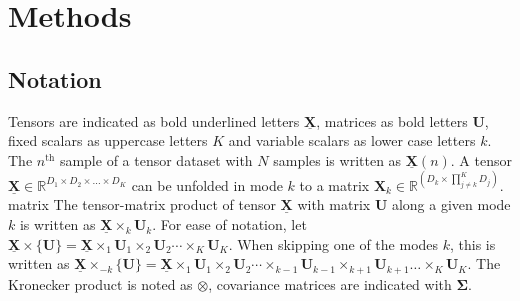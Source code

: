 \documentclass[twocolumn]{article}
\newcommand{\ten}[1]{\underline{\mathbf{#1}}} %
\newcommand{\mat}[1]{\mathbf{#1}} %
\newcommand{\mpr}[2]{\times_{#2} {#1}_{#2}} %
\newcommand{\mmpr}[1]{\times\{#1\}} %
\newcommand{\mmprs}[2]{\times_{-#2}\{#1\}} %
\begin{document}
\section{Methods}

\subsection{Notation}
Tensors are indicated as bold underlined letters $\ten{X}$, matrices as bold
letters $\mat{U}$, fixed scalars as uppercase letters $K$ and variable
scalars as lower case letters $k$.
The $n^\text{th}$ sample of a tensor dataset with $N$ samples is written as
$\ten{X}(n)$.
A tensor $\ten{X}\in \mathbb{R}^{D_1\times D_2 \times \ldots \times D_K}$ can be unfolded in mode
$k$ to a matrix $\mat{X}_k\in\mathbb{R}^{(D_k\times\prod_{j\neq k}^K D_j)}$.
matrix
The tensor-matrix product of tensor $\ten{X}$ with matrix $\mat{U}$ along a
given mode $k$ is written as $\ten{X}\mpr{\mat{U}}{k}$. For ease of notation, let
$\ten{X}\mmpr{\mat{U}} =
	\ten{X}\mpr{\mat{U}}{1}\mpr{\mat{U}}{2}\cdots\mpr{\mat{U}}{K}$.
When skipping one of the modes $k$, this is
written as $\ten{X}\mmprs{\mat{U}}{k} =
	\ten{X}\mpr{\mat{U}}{1}\mpr{\mat{U}}{2}\cdots\mpr{\mat{U}}{k-1}\mpr{\mat{U}}{k+1}\ldots\mpr{\mat{U}}{K}$.
The Kronecker product is noted as $\otimes$, covariance matrices are indicated  with $\mat{\Sigma}$.
\end{document}
